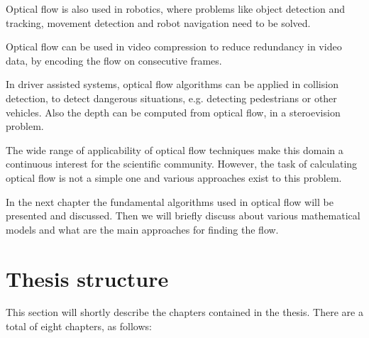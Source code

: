 \documentclass[12pt,a4paper,twoside]{report}
\begin{document}
Optical flow is also used in robotics, where problems like object detection and tracking, movement detection and robot navigation need to be solved.

Optical flow can be used in video compression to reduce redundancy in video data, by encoding the flow on consecutive frames.

In driver assisted systems, optical flow algorithms can be applied in collision detection, to detect dangerous situations, e.g. detecting pedestrians or other vehicles. Also the depth can be computed from optical flow, in a steroevision problem.

The wide range of applicability of optical flow techniques make this domain a continuous interest for the scientific community. However, the task of calculating optical flow is not a simple one and various approaches exist to this problem. 

In the next chapter the fundamental algorithms used in optical flow will be presented and discussed. Then we will briefly discuss about various mathematical models and what are the main approaches for finding the flow.

\section{Thesis structure}
This section will shortly describe the chapters contained in the thesis. There are a total of eight chapters, as follows:
\end{document}

